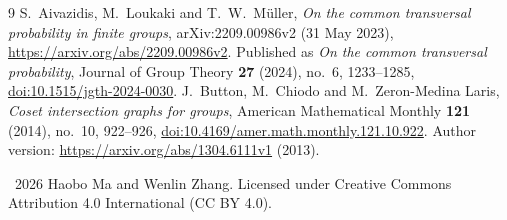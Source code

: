 \documentclass[11pt]{article}
\begin{document}
\begin{thebibliography}{9}
S.~Aivazidis, M.~Loukaki and T.~W.~M\"uller,
\emph{On the common transversal probability in finite groups},
arXiv:2209.00986v2 (31 May 2023),
\url{https://arxiv.org/abs/2209.00986v2}.
Published as \emph{On the common transversal probability},
Journal of Group Theory \textbf{27} (2024), no.~6, 1233--1285,
\href{https://doi.org/10.1515/jgth-2024-0030}{doi:10.1515/jgth-2024-0030}.
J.~Button, M.~Chiodo and M.~Zeron-Medina Laris,
\emph{Coset intersection graphs for groups},
American Mathematical Monthly \textbf{121} (2014), no.~10, 922--926,
\href{https://doi.org/10.4169/amer.math.monthly.121.10.922}{doi:10.4169/amer.math.monthly.121.10.922}.
Author version: \url{https://arxiv.org/abs/1304.6111v1} (2013).
\end{thebibliography}
\bigskip
\noindent\small\textcopyright\ 2026 Haobo Ma and Wenlin Zhang.
Licensed under Creative Commons Attribution 4.0 International (CC BY 4.0).
\end{document}
